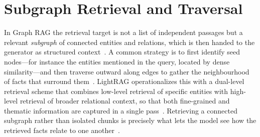 \section{Subgraph Retrieval and Traversal}
\label{sec:gr-subgraph}

In Graph RAG the retrieval target is not a list of independent passages but a
relevant \emph{subgraph} of connected entities and relations, which is then
handed to the generator as structured context~\cite{peng2024graphrag}. A common
strategy is to first identify seed nodes---for instance the entities mentioned in
the query, located by dense similarity---and then traverse outward along edges to
gather the neighbourhood of facts that surround them~\cite{peng2024graphrag}.
LightRAG operationalizes this with a dual-level retrieval scheme that combines
low-level retrieval of specific entities with high-level retrieval of broader
relational context, so that both fine-grained and thematic information are
captured in a single pass~\cite{guo2024lightrag}. Retrieving a connected subgraph
rather than isolated chunks is precisely what lets the model see how the retrieved
facts relate to one another~\cite{peng2024graphrag}.
